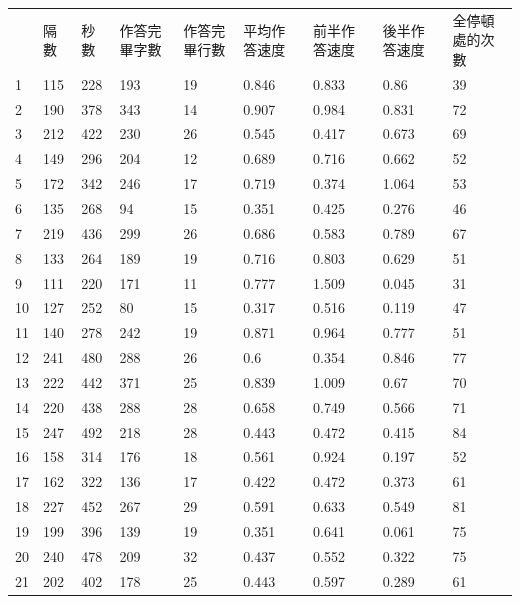 \begin{table}[]
	\label{table1}
	\begin{tabular}{lllllllll}
		& 隔數  & 秒數  & 作答完畢字數 & 作答完畢行數 & 平均作答速度 & 前半作答速度 & 後半作答速度 & 全停頓處的次數 \\
		1  & 115 & 228 & 193    & 19     & 0.846  & 0.833  & 0.86   & 39      \\
		2  & 190 & 378 & 343    & 14     & 0.907  & 0.984  & 0.831  & 72      \\
		3  & 212 & 422 & 230    & 26     & 0.545  & 0.417  & 0.673  & 69      \\
		4  & 149 & 296 & 204    & 12     & 0.689  & 0.716  & 0.662  & 52      \\
		5  & 172 & 342 & 246    & 17     & 0.719  & 0.374  & 1.064  & 53      \\
		6  & 135 & 268 & 94     & 15     & 0.351  & 0.425  & 0.276  & 46      \\
		7  & 219 & 436 & 299    & 26     & 0.686  & 0.583  & 0.789  & 67      \\
		8  & 133 & 264 & 189    & 19     & 0.716  & 0.803  & 0.629  & 51      \\
		9  & 111 & 220 & 171    & 11     & 0.777  & 1.509  & 0.045  & 31      \\
		10 & 127 & 252 & 80     & 15     & 0.317  & 0.516  & 0.119  & 47      \\
		11 & 140 & 278 & 242    & 19     & 0.871  & 0.964  & 0.777  & 51      \\
		12 & 241 & 480 & 288    & 26     & 0.6    & 0.354  & 0.846  & 77      \\
		13 & 222 & 442 & 371    & 25     & 0.839  & 1.009  & 0.67   & 70      \\
		14 & 220 & 438 & 288    & 28     & 0.658  & 0.749  & 0.566  & 71      \\
		15 & 247 & 492 & 218    & 28     & 0.443  & 0.472  & 0.415  & 84      \\
		16 & 158 & 314 & 176    & 18     & 0.561  & 0.924  & 0.197  & 52      \\
		17 & 162 & 322 & 136    & 17     & 0.422  & 0.472  & 0.373  & 61      \\
		18 & 227 & 452 & 267    & 29     & 0.591  & 0.633  & 0.549  & 81      \\
		19 & 199 & 396 & 139    & 19     & 0.351  & 0.641  & 0.061  & 75      \\
		20 & 240 & 478 & 209    & 32     & 0.437  & 0.552  & 0.322  & 75      \\
		21 & 202 & 402 & 178    & 25     & 0.443  & 0.597  & 0.289  & 61      \\

\end{tabular}
\end{table}
